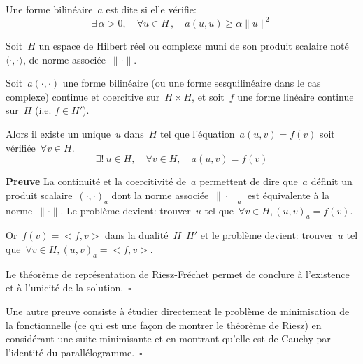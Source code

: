 \medskip
\begin{definition}
Une forme bilinéaire~$a$ est dite  si elle vérifie:
\begin{equation}
\exists\,\alpha>0,\quad \forall u\in H\,,\quad a(u,u) \geq \alpha\|u\|^2
\end{equation}
\end{definition}

\begin{theoreme}
Soit~$H$ un espace de Hilbert réel ou complexe muni de son produit scalaire noté
$\langle\cdot,\cdot\rangle$, de norme associée~$\|\cdot\|$.

Soit~$a(\cdot,\cdot)$ une forme bilinéaire (ou une forme sesquilinéaire dans le cas complexe)
continue et coercitive sur~$H\times H$, et soit~$f$ une forme linéaire continue sur~$H$ (i.e.
$f\in H'$).

Alors il existe un unique~$u$ dans~$H$ tel que l'équation~$a(u,v) = f(v)$ soit
vérifiée~$\forall v \in H$.
\begin{equation}
  \exists!\ u \in H,\quad \forall v\in H,\quad a(u,v)=f(v)
\end{equation}
\end{theoreme}


\medskip
{\noindent\footnotesize{}
\textbf{Preuve}\hskip5pt
La continuité et la coercitivité de~$a$ permettent de dire que~$a$ définit
un produit scalaire~$(\cdot,\cdot)_a$ dont la norme associée~$\|\cdot\|_a$ est
équivalente à la norme~$\|\cdot\|$.
Le problème devient: trouver~$u$ tel que~$\forall v\in H, (u,v)_a=f(v)$.

Or~$f(v)=<f,v>$ dans la dualité~$H$~$H'$ et le problème devient:
trouver~$u$ tel que~$\forall v\in H, (u,v)_a=<f,v>$.

Le théorème de représentation de Riesz-Fréchet permet de conclure à l'existence
et à l'unicité de la solution.~$\square$

\noindent
Une autre preuve consiste à étudier directement le problème de minimisation de la
fonctionnelle  (ce qui est une façon de montrer le théorème de Riesz)
en considérant une suite minimisante et en montrant qu'elle est de Cauchy
par l'identité du parallélogramme.~$\square$
}


